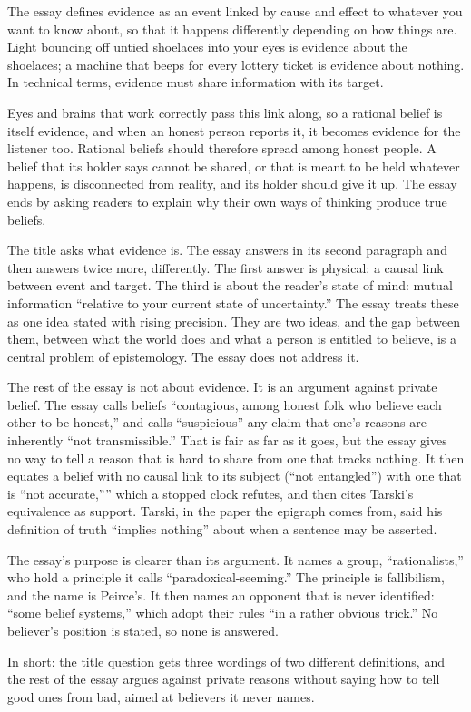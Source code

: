 \begin{afterword}
\summaryhead

The essay defines evidence as an event linked by cause and effect to whatever you want to know about, so that it happens differently depending on how things are. Light bouncing off untied shoelaces into your eyes is evidence about the shoelaces; a machine that beeps for every lottery ticket is evidence about nothing. In technical terms, evidence must share information with its target.

Eyes and brains that work correctly pass this link along, so a rational belief is itself evidence, and when an honest person reports it, it becomes evidence for the listener too. Rational beliefs should therefore spread among honest people. A belief that its holder says cannot be shared, or that is meant to be held whatever happens, is disconnected from reality, and its holder should give it up. The essay ends by asking readers to explain why their own ways of thinking produce true beliefs.

\responsehead

The title asks what evidence is. The essay answers in its second paragraph and then answers twice more, differently. The first answer is physical: a causal link between event and target. The third is about the reader's state of mind: mutual information ``relative to your current state of uncertainty.'' The essay treats these as one idea stated with rising precision. They are two ideas, and the gap between them, between what the world does and what a person is entitled to believe, is a central problem of epistemology. The essay does not address it.

The rest of the essay is not about evidence. It is an argument against private belief. The essay calls beliefs ``contagious, among honest folk who believe each other to be honest,'' and calls ``suspicious'' any claim that one's reasons are inherently ``not transmissible.'' That is fair as far as it goes, but the essay gives no way to tell a reason that is hard to share from one that tracks nothing. It then equates a belief with no causal link to its subject (``not entangled'') with one that is ``not accurate,'''' which a stopped clock refutes, and then cites Tarski's equivalence as support. Tarski, in the paper the epigraph comes from, said his definition of truth ``implies nothing'' about when a sentence may be asserted.

The essay's purpose is clearer than its argument. It names a group, ``rationalists,'' who hold a principle it calls ``paradoxical-seeming.'' The principle is fallibilism, and the name is Peirce's. It then names an opponent that is never identified: ``some belief systems,'' which adopt their rules ``in a rather obvious trick.'' No believer's position is stated, so none is answered.

In short: the title question gets three wordings of two different definitions, and the rest of the essay argues against private reasons without saying how to tell good ones from bad, aimed at believers it never names.
\end{afterword}

